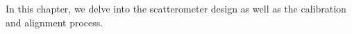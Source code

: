 \label{ch:design}

In this chapter, we delve into the scatterometer design as well as the calibration and alignment process. 

